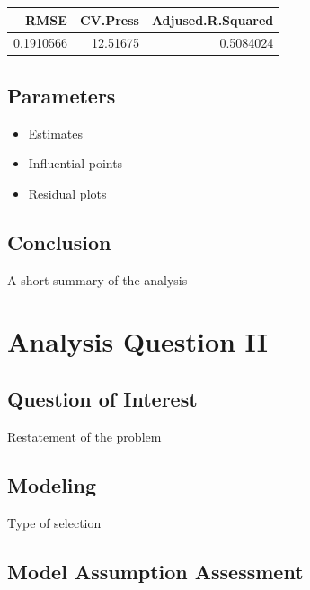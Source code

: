 \documentclass[american,]{article}
\providecommand{\tightlist}{%
  \setlength{\itemsep}{0pt}\setlength{\parskip}{0pt}}
\begin{document}
\begin{tabular}{r|r|r}
\hline
RMSE & CV.Press & Adjused.R.Squared\\
\hline
0.1910566 & 12.51675 & 0.5084024\\
\hline
\end{tabular}

\hypertarget{parameters}{%
\subsection{Parameters}\label{parameters}}

\begin{itemize}
\tightlist
\item
  Estimates
\item
  Influential points
\item
  Residual plots
\end{itemize}

\hypertarget{conclusion}{%
\subsection{Conclusion}\label{conclusion}}

A short summary of the analysis

\hypertarget{analysis-question-ii}{%
\section{Analysis Question II}\label{analysis-question-ii}}

\hypertarget{question-of-interest-1}{%
\subsection{Question of Interest}\label{question-of-interest-1}}

Restatement of the problem

\hypertarget{modeling-1}{%
\subsection{Modeling}\label{modeling-1}}

Type of selection

\hypertarget{model-assumption-assessment-1}{%
\subsection{Model Assumption
Assessment}\label{model-assumption-assessment-1}}
\end{document}
